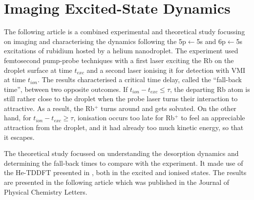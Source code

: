 \chapter{Imaging Excited-State Dynamics}
	The following article is a combined experimental and theoretical study focussing on imaging and characterising the dynamics following the 5p$\leftarrow$5s and 6p$\leftarrow$5s excitations of rubidium hosted by a helium nanodroplet. The experiment used femtosecond pump-probe techniques with a first laser exciting the Rb on the droplet surface at time $t_{exc}$ and a second laser ionising it for detection with VMI at time $t_{ion}$. The results characterised a critical time delay, called the ``fall-back time'', between two opposite outcomes. If $t_{ion}-t_{exc}\leq\tau$, the departing Rb atom is still rather close to the droplet when the probe laser turns their interaction to attractive. As a result, the Rb$^+$ turns around and gets solvated. On the other hand, for $t_{ion}-t_{exc}\geq\tau$, ionisation occurs too late for Rb$^+$ to feel an appreciable attraction from the droplet, and it had already too much kinetic energy, so that it escapes. 
	
	The theoretical study focussed on understanding the desorption dynamics and determining the fall-back times to compare with the experiment. It made use of the He-TDDFT presented in , both in the excited and ionised states. The results are presented in the following article which was published in the Journal of Physical Chemistry Letters\citep{Vangerow2017}.
	
	